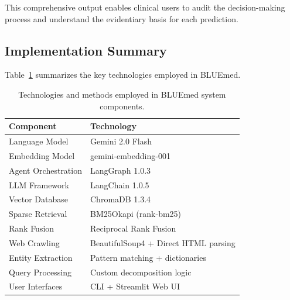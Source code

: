 \documentclass[11pt]{article}
\begin{document}
This comprehensive output enables clinical users to audit the decision-making process and understand the evidentiary basis for each prediction.

\subsection{Implementation Summary}

Table~\ref{tab:technologies} summarizes the key technologies employed in BLUEmed.

\begin{table}[h]
\centering
\begin{tabular}{ll}
\hline
\textbf{Component} & \textbf{Technology} \\
\hline
Language Model & Gemini 2.0 Flash \\
Embedding Model & gemini-embedding-001 \\
Agent Orchestration & LangGraph 1.0.3 \\
LLM Framework & LangChain 1.0.5 \\
Vector Database & ChromaDB 1.3.4 \\
Sparse Retrieval & BM25Okapi (rank-bm25) \\
Rank Fusion & Reciprocal Rank Fusion \\
Web Crawling & BeautifulSoup4 + Direct HTML parsing \\
Entity Extraction & Pattern matching + dictionaries \\
Query Processing & Custom decomposition logic \\
User Interfaces & CLI + Streamlit Web UI \\
\hline
\end{tabular}
\caption{Technologies and methods employed in BLUEmed system components.}
\label{tab:technologies}
\end{table}
\end{document}
